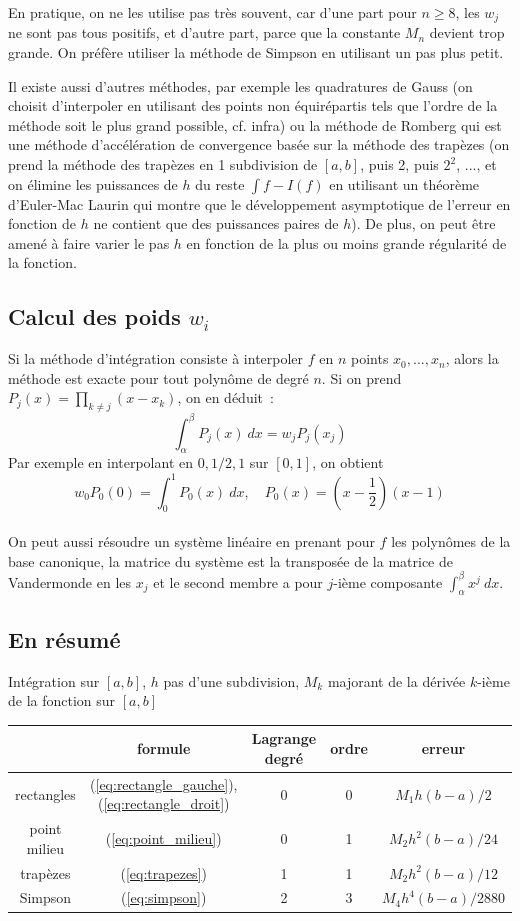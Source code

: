 \documentclass[a4paper,11pt]{article}
\begin{document}
\begin{giacjshere}
En pratique, on ne les utilise pas tr\`es souvent, car d'une part
pour $n\geq 8$, les $w_j$ ne sont pas tous positifs, et
d'autre part, parce que la constante $M_n$ devient trop
grande. On pr\'ef\`ere utiliser la m\'ethode de Simpson en utilisant
un pas plus petit.

Il existe aussi d'autres m\'ethodes, par exemple les quadratures de Gauss
(on choisit d'interpoler en utilisant des points non \'equir\'epartis 
tels que l'ordre de la m\'ethode soit le plus grand possible, cf. infra)
ou la m\'ethode de Romberg qui est une m\'ethode d'acc\'el\'eration
de convergence bas\'ee sur la m\'ethode des trap\`ezes (on prend
la m\'ethode des trap\`ezes en 1 subdivision de $[a,b]$, puis
2, puis $2^2$, ..., et on \'elimine les puissances de $h$
du reste $\int f-I(f)$ en utilisant un th\'eor\`eme d'Euler-Mac Laurin
qui montre que le d\'eveloppement asymptotique de
l'erreur en fonction de $h$ ne contient que des puissances paires
de $h$). De plus, on peut être amen\'e à faire varier le pas $h$
en fonction de la plus ou moins grande r\'egularit\'e de la fonction.


\subsection{Calcul des poids $w_i$} \label{sec:poids}
Si la m\'ethode d'int\'egration consiste \`a interpoler 
$f$ en $n$ points $x_0,...,x_n$, alors la m\'ethode est exacte pour
tout polyn\^ome de degr\'e $n$. Si on prend 
$P_j(x)=\prod_{k \neq j}(x-x_k)$, on en d\'eduit~:
$$ \int_\alpha^\beta P_j(x) \ dx = w_j P_j(x_j) $$ 
Par exemple en interpolant en $0,1/2,1$ sur $[0,1]$, on obtient
$$w_0 P_0(0)=\int_0^1 P_0(x) \ dx, \quad P_0(x)=(x-\frac12)(x-1)$$
\\
On peut aussi r\'esoudre un syst\`eme lin\'eaire en prenant pour $f$
les polyn\^omes de la base canonique, la matrice du syst\`eme est
la transpos\'ee de la matrice de Vandermonde en les $x_j$ et le second
membre a pour $j$-i\`eme composante $\int_\alpha^\beta x^j \ dx$.


\subsection{En r\'esum\'e}
Int\'egration sur $[a,b]$, $h$ pas d'une subdivision, $M_k$ majorant
de la d\'eriv\'ee $k$-i\`eme de la fonction sur $[a,b]$\\
\begin{tabular}{|c|c|c|c|c|} \hline 
 & formule & Lagrange degr\'e & ordre & erreur \\ \hline
rectangles & (\ref{eq:rectangle_gauche}), (\ref{eq:rectangle_droit}) & 0 & 0 & $M_1 h (b-a)/2$ \\
point milieu & (\ref{eq:point_milieu}) & 0 & 1 & $M_2 h^2 (b-a)/24$ \\
trap\`ezes & (\ref{eq:trapezes}) & 1 & 1 & $M_2 h^2 (b-a)/12$ \\
Simpson & (\ref{eq:simpson})& 2 & 3 & $M_4 h^4 (b-a)/2880$  \\ \hline
\end{tabular}


\end{giacjshere}
\end{document}
